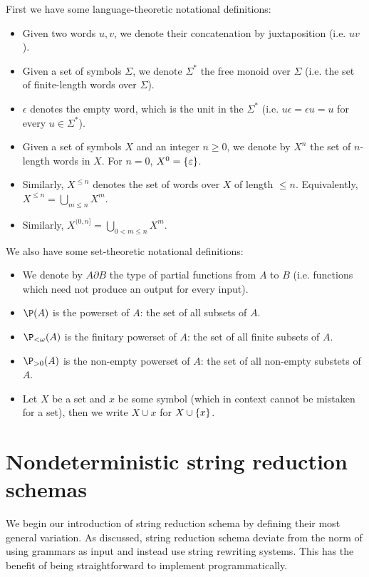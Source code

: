 \documentclass{llncs}
\begin{document}
First we have some language-theoretic notational definitions:
\begin{itemize}
    \item Given two words $u,v$, we denote their concatenation by juxtaposition (i.e. $uv$).
    \item Given a set of symbols $\Sigma$, we denote $\Sigma^*$ the free monoid over $\Sigma$ (i.e. the set of finite-length words over $\Sigma$).
    \item $\epsilon$ denotes the empty word, which is the unit in the $\Sigma^*$ (i.e. $u\epsilon=\epsilon u=u$ for every $u\in\Sigma^*$).
    \item Given a set of symbols $X$ and an integer $n\geq0$, we denote by $X^n$ the set of $n$-length words in $X$.
    For $n=0$, $X^0=\set\epsilon$.
    \item Similarly, $X^{\leq n}$ denotes the set of words over $X$ of length $\leq n$.
    Equivalently, $X^{\leq n}=\bigcup_{m\leq n}X^m$.
    \item Similarly, $X^{(0,n]}=\bigcup_{0<m\leq n}X^m$.
\end{itemize}

We also have some set-theoretic notational definitions:
\begin{itemize}
    \item We denote by $A\partial B$ the type of partial functions from $A$ to $B$ (i.e. functions which need not produce an output for every input).
    \item $\P(A)$ is the powerset of $A$: the set of all subsets of $A$.
    \item $\P_{<\omega}(A)$ is the finitary powerset of $A$: the set of all finite subsets of $A$.
    \item $\P_{>0}(A)$ is the non-empty powerset of $A$: the set of all non-empty substets of $A$.
    \item Let $X$ be a set and $x$ be some symbol (which in context cannot be mistaken for a set), then we write $X\cup x$ for $X\cup\set x$.
\end{itemize}

\section{Nondeterministic string reduction schemas}

We begin our introduction of string reduction schema by defining their most general variation.
As discussed, string reduction schema deviate from the norm of using grammars as input and instead use string rewriting systems.
This has the benefit of being straightforward to implement programmatically.
\end{document}
